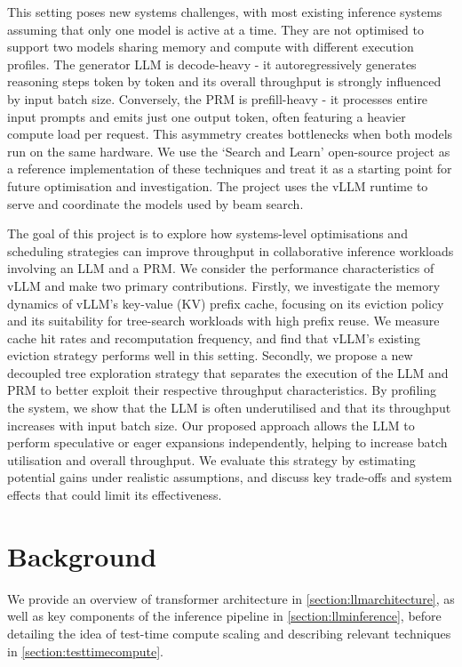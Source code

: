 \documentclass[12pt,twoside]{report}
\begin{document}
This setting poses new systems challenges, with most existing inference systems assuming that only one model is active at a time.
They are not optimised to support two models sharing memory and compute with different execution profiles.
The generator LLM is decode-heavy - it autoregressively generates reasoning steps token by token and its overall throughput is strongly influenced by input batch size.
Conversely, the PRM is prefill-heavy - it processes entire input prompts and emits just one output token, often featuring a heavier compute load per request.
This asymmetry creates bottlenecks when both models run on the same hardware.
We use the `Search and Learn' open-source project \cite{beeching2024scalingtesttimecompute} as a reference implementation of these techniques and treat it as a starting point for future optimisation and investigation.
The project uses the vLLM runtime \cite{kwon2023efficient} to serve and coordinate the models used by beam search.  

The goal of this project is to explore how systems-level optimisations and scheduling strategies can improve throughput in collaborative inference workloads involving an LLM and a PRM.
We consider the performance characteristics of vLLM and make two primary contributions.
Firstly, we investigate the memory dynamics of vLLM’s key-value (KV) prefix cache, focusing on its eviction policy and its suitability for tree-search workloads with high prefix reuse.
We measure cache hit rates and recomputation frequency, and find that vLLM’s existing eviction strategy performs well in this setting.
Secondly, we propose a new decoupled tree exploration strategy that separates the execution of the LLM and PRM to better exploit their respective throughput characteristics.
By profiling the system, we show that the LLM is often underutilised and that its throughput increases with input batch size.
Our proposed approach allows the LLM to perform speculative or eager expansions independently, helping to increase batch utilisation and overall throughput.
We evaluate this strategy by estimating potential gains under realistic assumptions, and discuss key trade-offs and system effects that could limit its effectiveness.


\chapter{Background} %
We provide an overview of transformer architecture in \ref{section:llmarchitecture}, as well as key components of the inference pipeline in \ref{section:llminference}, before detailing the idea of test-time compute scaling and describing relevant techniques in \ref{section:testtimecompute}.
\end{document}
